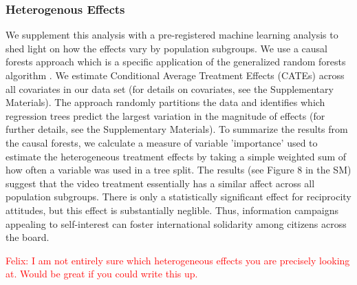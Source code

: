 \documentclass[12pt,oneside,smallheadings,chapterprefix=true]{article}
\begin{document}
\subsubsection*{Heterogenous Effects} 
We supplement this analysis with a pre-registered machine learning analysis to shed light on how the effects vary by population subgroups.  We use a causal forests approach \citep{wager2018estimation} which is a specific application of the generalized random forests algorithm \citep{athey2019generalized}. We estimate Conditional Average Treatment Effects (CATEs) across all covariates in our data set (for details on covariates, see the Supplementary Materials). The approach randomly partitions the data and identifies which regression trees predict the largest variation in the magnitude of effects (for further details, see the Supplementary Materials). To summarize the results from the causal forests, we calculate a measure of variable 'importance' used to estimate the heterogeneous treatment effects by taking a simple weighted sum of how often a variable was used in a tree split. The results (see Figure 8 in the SM) suggest that the video treatment essentially has a similar affect across all population subgroups. There is only a statistically significant effect for reciprocity attitudes, but this effect is substantially neglible. Thus, information campaigns appealing to self-interest can foster international solidarity among citizens across the board. 


\textcolor{red}{Felix: I am not entirely sure which heterogeneous effects you are precisely looking at. Would be great if you could write this up.} 





\end{document}
